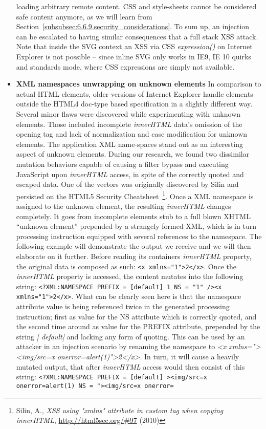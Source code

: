 \begin{itemize}
loading arbitrary remote content. CSS and style-sheets cannot be considered safe content anymore, as we will learn from Section~\ref{subsubsec:6.6.9.security_considerations}. To sum up, an \textit{\@import} injection can be escalated to having similar consequences that a full stack XSS attack. Note that inside the SVG context an XSS via CSS \textit{expression()} on Internet Explorer is not possible -- since inline SVG only works in IE9, IE 10 quirks and standards mode, where CSS expressions are simply not available.
     \item \textbf{XML namespaces unwrapping on unknown elements} In comparison to actual HTML elements, older versions of Internet Explorer handle elements outside the HTML4 doc-type based specification in a slightly different way. Several minor flaws were discovered while experimenting with unknown elements. Those included incomplete \textit{innerHTML} data's omission of the opening tag and lack of normalization and case modification for unknown elements. The application XML name-spaces stand out as an interesting aspect of unknown elements. During our research, we found two dissimilar mutation behaviors capable of causing a filter bypass and executing JavaScript upon \textit{innerHTML} access, in spite of the correctly quoted and escaped data. One of the vectors was originally discovered by Silin and persisted on the HTML5 Security Cheatsheet~\footnote{Silin, A., \textit{XSS using "xmlns" attribute in custom tag when copying innerHTML}, \url{http://html5sec.org/#97} (2010)}. 
     Once a XML namespace is assigned to the unknown element, the resulting \textit{innerHTML} changes completely. It goes from incomplete elements stub to a full blown XHTML ``unknown element'' prepended by a strangely formed XML, which is in turn processing instruction equipped with several references to the namespace. The following example will demonstrate the output we receive and we will then elaborate on it further. Before reading its containers \textit{innerHTML} property, the original data is composed as such: \texttt{<x xmlns="1">2</x>}. Once the \textit{innerHTML} property is accessed, the content mutates into the following string: \texttt{<?XML:NAMESPACE PREFIX = [default] 1 NS = "1" /><x xmlns="1">2</x>}. What can be clearly seen here is that the namespace attribute value is being referenced twice in the generated processing instruction; first as value for the NS attribute which is correctly quoted, and the second time around as value for the PREFIX attribute, prepended by the string \textit{[
default]} and lacking any form of quoting. This can be used by an attacker in an injection scenario by renaming the namespace to \textit{<x xmlns="><img/src=x onerror=alert(1)">2</x>}. In turn, it will cause a heavily mutated output, that after \textit{innerHTML} access would then consist of this string: \texttt{<?XML:NAMESPACE PREFIX = [default] ><img/src=x onerror=alert(1) NS = "><img/src=x onerror=\\
}
\end{itemize}
